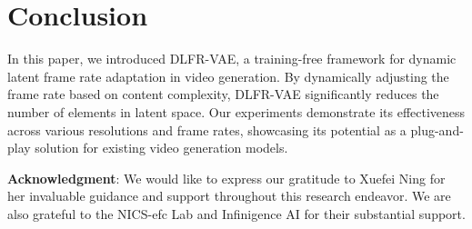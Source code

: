 \section{Conclusion}

In this paper, we introduced DLFR-VAE, a training-free framework for dynamic latent frame rate adaptation in video generation. By dynamically adjusting the frame rate based on content complexity, DLFR-VAE significantly reduces the number of elements in latent space.
Our experiments demonstrate its effectiveness across various resolutions and frame rates, showcasing its potential as a plug-and-play solution for existing video generation models. 






\textbf{Acknowledgment}:
We would like to express our gratitude to Xuefei Ning for her invaluable guidance and support throughout this research endeavor. We are also grateful to the NICS-efc Lab and Infinigence AI for their substantial support.